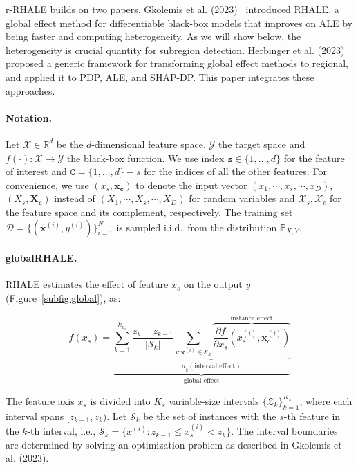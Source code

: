 \documentclass[
twocolumn,
]{ceurart}
\newcommand{\xb}{\mathbf{x}}
\newcommand{\xc}{\mathbf{x_c}}
\newcommand{\Xc}{\mathbf{X_c}}
\newcommand{\xci}{\mathbf{x}^{(i)}_c}
\begin{document}
r-RHALE builds on two papers. Gkolemis et al. (2023)~\citep{gkolemis2023rhale} introduced RHALE, a global effect method for differentiable black-box models that improves on ALE by being faster and computing heterogeneity. As we will show below, the heterogeneity is crucial quantity for subregion detection. Herbinger et al. (2023)~\citep{herbinger2023decomposing} proposed a generic framework for transforming global effect methods to regional, and applied it to PDP\cite{friedman_predictive_2008}, ALE\cite{apley_visualizing_2020}, and SHAP-DP\cite{lundberg2017unified}. This paper integrates these approaches.

\paragraph{Notation.}

Let \(\mathcal{X} \in \mathbb{R}^d\) be the \(d\)-dimensional feature space, \(\mathcal{Y}\) the target space and
\(f(\cdot) : \mathcal{X} \rightarrow \mathcal{Y}\) the black-box function.
We use index \(\mathtt{s} \in \{1, \ldots, d\}\) for the feature of interest and \(\mathtt{C} = \{1, \ldots, d\} - s\) for the indices of all the other features.
For convenience, we use \((x_s, \xc)\) to denote the input vector \((x_1, \cdots , x_s, \cdots, x_D)\),
\((X_s, \Xc)\) instead of \((X_1, \cdots , X_s, \cdots, X_D)\) for random variables and
$\mathcal{X}_s, \mathcal{X}_{c}$ for the feature space and its complement, respectively.
The training set \(\mathcal{D} = \{(\xb^{(i)}, y^{(i)})\}_{i=1}^N\) is sampled
i.i.d.\ from the distribution \(\mathbb{P}_{X,Y}\).

\paragraph{globalRHALE.}

RHALE estimates the effect of feature $x_s$ on the output $y$ (Figure~\ref{subfig:global}), as:

\begin{equation}
  \label{eq:rhale-approximation}
f(x_s) = \underbrace{\sum_{k=1}^{k_{x_s}} \underbrace{\frac{z_k - z_{k-1}}{ \left | \mathcal{S}_k \right |} \sum_{i: \xb^{(i)} \in \mathcal{S}_k} \overbrace{\frac{\partial f}{\partial x_s} (x_s^{(i)}, \xci)}^{\text{instance effect}}}_{\mu_k (\text{interval effect})}}_{\text{global effect}}
\end{equation}

\noindent
The feature axis $x_s$ is divided into $K_s$ variable-size intervals $\{\mathcal{Z}_k\}_{k=1}^{K_s}$, where each interval spans $[z_{k-1}, z_k)$. Let $\mathcal{S}_k$ be the set of instances with the $s$-th feature in the $k$-th interval, i.e., $\mathcal{S}_k = \{ x^{(i)} : z_{k-1} \leq x^{(i)}_s < z_k \}$. The interval boundaries are determined by solving an optimization problem as described in Gkolemis et al. (2023).
\end{document}
